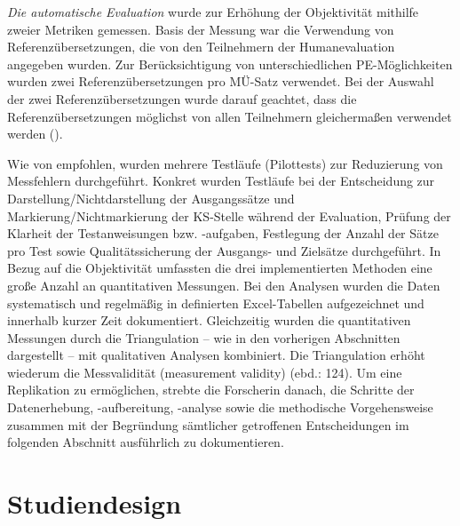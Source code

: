 \textit{Die automatische Evaluation} wurde zur Erhöhung der Objektivität mithilfe zweier Metriken gemessen. Basis der Messung war die Verwendung von Referenzübersetzungen, die von den Teilnehmern der Humanevaluation angegeben wurden. Zur Berücksichtigung von unterschiedlichen PE-Möglichkeiten wurden zwei Referenzübersetzungen pro MÜ-Satz verwendet. Bei der Auswahl der zwei Referenzübersetzungen wurde darauf geachtet, dass die Referenzübersetzungen möglichst von allen Teilnehmern gleichermaßen verwendet werden ().

Wie von \citet{FreyEtAl1991} empfohlen, wurden mehrere Testläufe (Pilottests) zur Reduzierung von Messfehlern durchgeführt. Konkret wurden Testläufe bei der Entscheidung zur Darstellung/Nichtdarstellung der Ausgangssätze und Markierung/Nichtmarkierung der KS-Stelle während der Evaluation, Prüfung der Klarheit der Testanweisungen bzw. -aufgaben, Festlegung der Anzahl der Sätze pro Test sowie Qualitätssicherung der Ausgangs- und Zielsätze durchgeführt. In Bezug auf die Objektivität umfassten die drei implementierten Methoden eine große Anzahl an quantitativen Messungen. Bei den Analysen wurden die Daten systematisch und regelmäßig in definierten Excel-Tabellen aufgezeichnet und innerhalb kurzer Zeit dokumentiert. Gleichzeitig wurden die quantitativen Messungen durch die Triangulation -- wie in den vorherigen Abschnitten dargestellt -- mit qualitativen Analysen kombiniert. Die Triangulation erhöht wiederum die Messvalidität (measurement validity) (ebd.: 124). Um eine Replikation zu ermöglichen, strebte die Forscherin danach, die Schritte der Datenerhebung, -aufbereitung, -analyse sowie die methodische Vorgehensweise zusammen mit der Begründung sämtlicher getroffenen Entscheidungen im folgenden Abschnitt ausführlich zu dokumentieren.

\section{\label{sec:4.4}Studiendesign}
\largerpage
